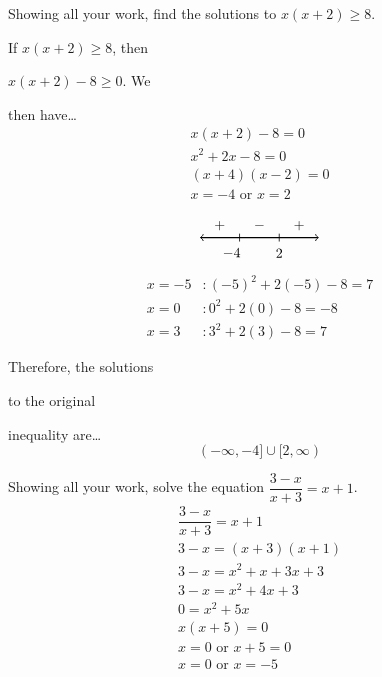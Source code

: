 \documentclass[12pt,letterpaper]{exam}
\begin{document}
\begin{questions}
\question[10] Showing all your work, find the solutions to $x(x + 2) \geq 8$. \pspace
	\begin{minipage}[b]{0.25\textwidth}
	If $x(x + 2) \geq 8$, then \par $x(x + 2) - 8 \geq 0$. We \par then have\dots
		\[
		\begin{gathered}
		x(x + 2) - 8= 0 \\[0.3cm]
		x^2 + 2x - 8= 0 \\[0.3cm]
		(x + 4)(x - 2)= 0 \\[0.3cm]
		x= -4 \text{ or } x= 2
		\end{gathered}
		\]
	\end{minipage} \hspace{0.5cm} \begin{minipage}[b]{0.3\textwidth}
		\[
		\begin{tikzpicture}
		\draw[line width=0.03cm,<->] (-1.5,0) -- (1.5,0);
		\draw[line width=0.02cm] (-0.5,-0.1) -- (-0.5,0.1);
		\draw[line width=0.02cm] (0.5,-0.1) -- (0.5,0.1);
		\node at (-0.7,-0.4) {$-4$};
		\node at (0.5,-0.4) {$2$};
		\node at (-1,0.3) {$+$};
		\node at (0,0.3) {$-$};
		\node at (1,0.3) {$+$};
		\end{tikzpicture}
		\]
		\[
		\begin{aligned}
		x= -5 &\colon (-5)^2 + 2(-5) - 8= 7 \\[0.1cm]
		x= 0 &\colon 0^2 + 2(0) - 8=-8 \\[0.1cm]
		x= 3 &\colon 3^2 + 2(3) - 8= 7
		\end{aligned}
		\]
	\end{minipage}\hspace{1.4cm}\begin{minipage}[b]{0.3\textwidth}
	Therefore, the solutions \par to the original \par inequality are\dots
		\[
		\boxed{(-\infty, -4] \cup [2, \infty)}
		\]
	\end{minipage} \par\vspace{1.1cm}



\question[10] Showing all your work, solve the equation $\dfrac{3 - x}{x + 3}= x + 1$. \pspace
	\[
	\begin{gathered}
	\dfrac{3 - x}{x + 3}= x + 1 \\[0.1cm]
	3 - x= (x + 3)(x + 1) \\[0.1cm]
	3 - x= x^2 + x + 3x + 3 \\[0.1cm]
	3 - x= x^2 + 4x + 3 \\[0.1cm]
	0= x^2 + 5x \\[0.1cm]
	x(x + 5)= 0 \\[0.1cm]
	x= 0 \text{ or } x + 5= 0 \\[0.1cm]
	\boxed{x= 0 \text{ or } x= -5}
	\end{gathered}
	\]




\end{questions}
\end{document}
